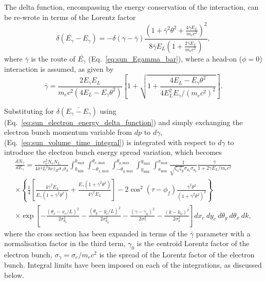 \documentclass[../main.tex]{subfiles}
\begin{document}
The delta function, encompassing the energy conservation of the interaction, can be re-wrote in terms of the Lorentz factor
\begin{equation}
\delta\left(\bar{E_{\gamma}}-E_{\gamma}\right) = -\delta\left(\gamma-\bar{\gamma}\right)\frac{\left(1+\bar{\gamma}^{2}\theta^{2}+\frac{4\bar{\gamma}E_{L}}{m_{e}c^{2}}\right)^{2}}{8\bar{\gamma}E_{L}\left(1+\frac{2\bar{\gamma}E_{L}}{m_{e}c^{2}}\right)},
\label{eq:sun_electron_energy_delta_function}    
\end{equation}
where $\bar{\gamma}$ is the route of $\bar{E_{\gamma}}$ (Eq.~\ref{eq:sun_Egamma_bar}), where a head-on ($\phi=0$) interaction is assumed, as given by
\begin{equation}
\bar{\gamma} = \frac{2E_{\gamma}E_{L}}{m_{e}c^{2}\left(4E_{L}-E_{\gamma}\theta^{2}\right)}\left[1+\sqrt{1+\frac{4E_{L}-E_{\gamma}\theta^{2}}{4E_{L}^{2}E_{\gamma}/\left(m_{e}c^{2}\right)^{2}}}\right].    
\end{equation}

Substituting for $\delta\left(\bar{E_{\gamma}-E_{\gamma}}\right)$ using (Eq.~\ref{eq:sun_electron_energy_delta_function}) and simply exchanging the electron bunch momentum variable from $dp$ to $d\gamma$, (Eq.~\ref{eq:sun_volume_time_integral}) is integrated with respect to $d\gamma$ to introduce the electron bunch energy spread variation, which becomes
\begin{multline}
\frac{dN_{\gamma}}{dE_{\gamma}} = \frac{r_{e}^{2}N_{e}N_{L}}{4\pi^{3}L^{2}\hbar c z_{R}\sigma_{\gamma}\sigma_{k}}\int_{k_{\mathrm{min}}}^{k_{\mathrm{max}}}\int_{-\theta_{x,\mathrm{max}}}^{\theta_{x,\mathrm{max}}}\int_{-\theta_{y,\mathrm{max}}}^{\theta_{y,\mathrm{max}}}\int_{y_{\mathrm{min}}}^{y_{\mathrm{max}}}\int_{x_{\mathrm{min}}}^{x_{\mathrm{max}}}\frac{1}{\sqrt{\zeta_{x}\zeta_{y}}\sigma_{\theta_{x}}\sigma_{\theta_{y}}}\frac{\bar{\gamma}}{1+2\gamma E_{L}/m_{e}c^{2}} \\
\times\left\{\frac{1}{4}\left[\frac{4\bar{\gamma}^{2}E_{L}}{E_{\gamma}\left(1+\bar{\gamma}^{2}\theta^{2}\right)}+\frac{E_{\gamma}\left(1+\bar{\gamma}^{2}\theta^{2}\right)}{4\bar{\gamma}^{2}E_{L}}\right]-2\cos^{2}\left(\tau-\phi_{f}\right)\frac{\bar{\gamma}^{2}\theta^{2}}{\left(1+\bar{\gamma}^{2}\theta^{2}\right)^{2}}\right\} \\
\times\exp{\left[-\frac{\left(\theta_{x}-x_{c}/L\right)^{2}}{2\sigma_{\theta_{x}}^{2}}-\frac{\left(\theta_{y}-y_{c}/L\right)^{2}}{2\sigma_{\theta_{y}}^{2}}-\frac{\left(\gamma-\gamma_{0}\right)^{2}}{2\sigma_{\gamma}^{2}}-\frac{\left(k-k_{0}\right)^{2}}{2\sigma_{k}^{2}}\right]}dx_{c}~dy_{c}~d\theta_{y}~d\theta_{x}~dk,
\label{eq:ICARUS_equation}
\end{multline}
where the cross section has been expanded in terms of the $\bar{\gamma}$ parameter with a normalisation factor in the third term, $\gamma_{0}$ is the centroid Lorentz factor of the electron bunch, $\sigma_{\gamma} = \sigma_{e}/m_{e}c^{2}$ is the spread of the Lorentz factor of the electron bunch. Integral limits have been imposed on each of the integrations, as discussed below. 
\end{document}
